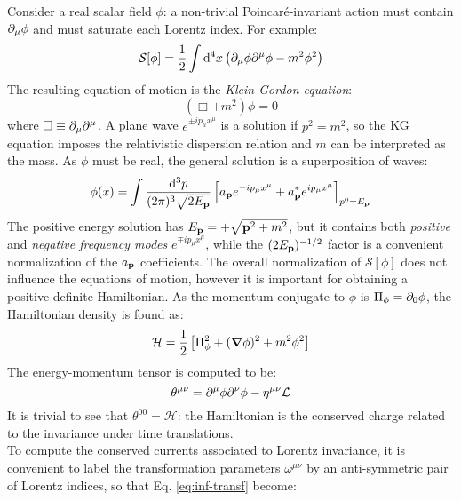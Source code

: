 Consider a real scalar field $ \phi $: a non-trivial Poincaré-invariant action must contain $ \partial_\mu \phi $ and must saturate each Lorentz index. For example:
\begin{equation}
  \mathcal{S}[\phi] = \frac{1}{2} \int \mathrm{d}^4 x \left( \partial_\mu \phi \partial^\mu \phi - m^2 \phi^2 \right)
\end{equation}
The resulting equation of motion is the \textit{Klein-Gordon equation}:
\begin{equation}
  \left( \Box + m^2 \right) \phi = 0
\end{equation}
where $ \Box \equiv \partial_\mu \partial^\mu $. A plane wave $ e^{\pm i p_\mu x^\mu} $ is a solution if $ p^2 = m^2 $, so the KG equation imposes the relativistic dispersion relation and $ m $ can be interpreted as the mass. As $ \phi $ must be real, the general solution is a superposition of waves:
\begin{equation}
  \phi(x) = \int \frac{\mathrm{d}^3 p}{(2\pi)^3 \sqrt{2E_{\mathbf{p}}}} \left[ a_{\mathbf{p}} e^{-i p_\mu x^\mu} + a^*_{\mathbf{p}} e^{i p_\mu x^\mu} \right]_{p^0 = E_{\mathbf{p}}}
  \label{eq:scalar-field-exp}
\end{equation}
The positive energy solution has $ E_{\mathbf{p}} = + \sqrt{\mathbf{p}^2 + m^2} $, but it contains both \textit{positive} and \textit{negative frequency modes} $ e^{\mp i p_\mu x^\mu} $, while the $ (2E_{\mathbf{p}})^{-1/2} $ factor is a convenient normalization of the $ a_{\mathbf{p}} $ coefficients. The overall normalization of $ \mathcal{S}[\phi] $ does not influence the equations of motion, however it is important for obtaining a positive-definite Hamiltonian. As the momentum conjugate to $ \phi $ is $ \Pi_\phi = \partial_0 \phi $, the Hamiltonian density is found as:
\begin{equation}
  \mathcal{H} = \frac{1}{2} \left[ \Pi_\phi^2 + (\boldsymbol{\nabla} \phi)^2 + m^2 \phi^2 \right]
  \label{eq:scalar-field-haml}
\end{equation}
The energy-momentum tensor is computed to be:
\begin{equation}
  \theta^{\mu \nu} = \partial^\mu \phi \partial^\nu \phi - \eta^{\mu \nu} \mathcal{L}
  \label{eq:scalar-field-en-mom-tens}
\end{equation}
It is trivial to see that $ \theta^{00} = \mathcal{H} $: the Hamiltonian is the conserved charge related to the invariance under time translations.\\
To compute the conserved currents associated to Lorentz invariance, it is convenient to label the transformation parameters $ \omega^{\mu \nu} $ by an anti-symmetric pair of Lorentz indices, so that Eq. \ref{eq:inf-transf} become:
